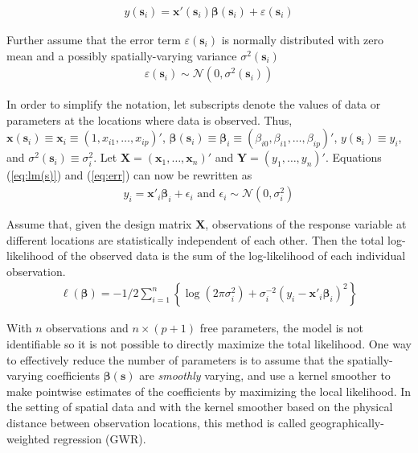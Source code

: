 \documentclass[authoryear, review, 11pt]{elsarticle}
\begin{document}
	\begin{eqnarray}
		y(\bm{s}_i) = \bm{x}'(\bm{s}_i) \bm{\beta}(\bm{s}_i) + \varepsilon(\bm{s}_i)
	\label{eq:lm(s)}
	\end{eqnarray}
	
	Further assume that the error term $\varepsilon(\bm{s}_i)$ is normally distributed with zero mean and a possibly spatially-varying variance $\sigma^2(\bm{s}_i)$
	\begin{eqnarray}
		\varepsilon(\bm{s}_i) \sim \mathcal{N} \left( 0,\sigma^2(\bm{s}_i) \right)
	\label{eq:err}
	\end{eqnarray}
	
	In order to simplify the notation, let subscripts denote the values of data or parameters at the locations where data is observed. Thus, $\bm{x}(\bm{s}_i) \equiv \bm{x}_i \equiv \left( 1, x_{i1}, \dots, x_{ip} \right)'$, $\bm{\beta}(\bm{s}_i) \equiv \bm{\beta}_i \equiv \left(\beta_{i0}, \beta_{i1}, \dots, \beta_{ip} \right)'$, $y(\bm{s}_i) \equiv y_i$, and $\sigma^2(\bm{s}_i) \equiv \sigma^2_i$. Let $\bm{X} = \left( \bm{x}_1, \dots, \bm{x}_n \right)'$ and $\bm{Y} = \left( y_1, \dots, y_n \right)'$. Equations (\ref{eq:lm(s)}) and (\ref{eq:err}) can now be rewritten as
	\begin{eqnarray}
		y_i = \bm{x}'_i \bm{\beta}_i + \epsilon_i \text{ and } \epsilon_i \sim \mathcal{N} \left( 0,\sigma_i^2 \right)
	\end{eqnarray}
	
	Assume that, given the design matrix $\bm{X}$, observations of the response variable at different locations are statistically independent of each other. Then the total log-likelihood of the observed data is the sum of the log-likelihood of each individual observation.
	 \begin{eqnarray}
	 	\ell\left( \bm{\beta} \right) = - 1/2 \sum_{i=1}^n \left\{  \log \left( 2 \pi \sigma^2_i\right) +  \sigma^{-2}_i  \left(y_i - \bm{x}'_i\bm{\beta}_i \right)^2  \right\}
	\end{eqnarray}
	
	With $n$ observations and $n \times (p+1)$ free parameters, the model is not identifiable so it is not possible to directly maximize the total likelihood. One way to effectively reduce the number of parameters is to assume that the spatially-varying coefficients $\bm{\beta}(\bm{s})$ are \emph{smoothly} varying, and use a kernel smoother to make pointwise estimates of the coefficients by maximizing the local likelihood. In the setting of spatial data and with the kernel smoother based on the physical distance between observation locations, this method is called geographically-weighted regression (GWR).
		
\end{document}
